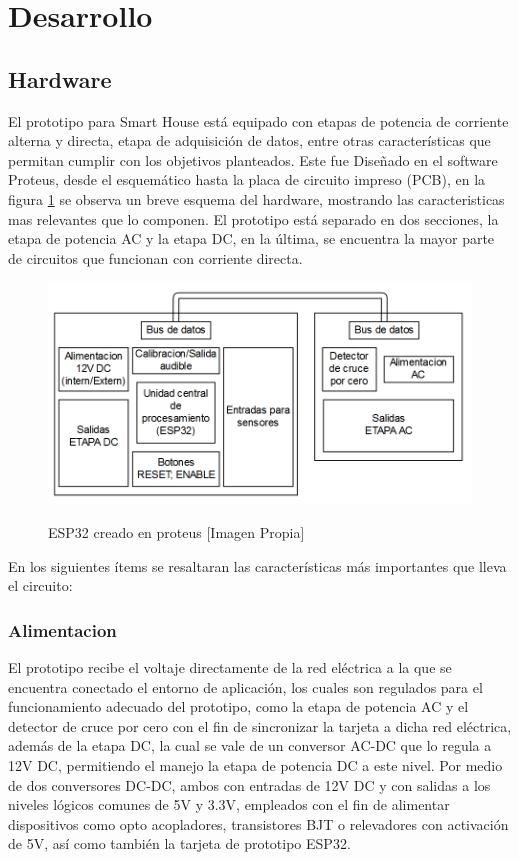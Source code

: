 \section{Desarrollo}
\subsection{Hardware}\label{sec:hw}

El prototipo para Smart House está equipado con etapas de potencia de corriente alterna y directa, etapa de adquisición de datos, entre otras características que permitan cumplir con los objetivos planteados. Este fue Diseñado en el software Proteus, desde el esquemático hasta la placa de circuito impreso (PCB), en la figura \ref{fig:esp32} se observa un breve esquema del hardware, mostrando las caracteristicas mas relevantes que lo componen. El prototipo está separado en dos secciones, la etapa de potencia AC y la etapa DC, en la última, se encuentra la mayor parte de circuitos que funcionan con corriente directa.\\

\begin{figure}[!t]
	\centering
	\caption{ESP32 creado en proteus [Imagen Propia]}
	\includegraphics[width=0.9\linewidth]{Imagenes/ESP32}	
	\label{fig:esp32}
\end{figure}

En los siguientes ítems se resaltaran las características más importantes que lleva el circuito:\\

	\subsubsection{Alimentacion}
	
	El prototipo recibe el voltaje directamente de la red eléctrica a la que se encuentra conectado el entorno de aplicación, los cuales son regulados para el funcionamiento adecuado del prototipo, como la etapa de potencia AC y el detector de cruce por cero con el fin de sincronizar la tarjeta a dicha red eléctrica, además de la etapa DC, la cual se vale de un conversor AC-DC que lo regula a 12V DC, permitiendo el manejo la etapa de potencia DC a este nivel.  Por medio de dos conversores DC-DC, ambos con entradas de 12V DC y con salidas a los niveles lógicos comunes de 5V y 3.3V, empleados con el fin de alimentar dispositivos como opto acopladores, transistores BJT o relevadores con activación de 5V, así como también la tarjeta de prototipo ESP32.\\
			
